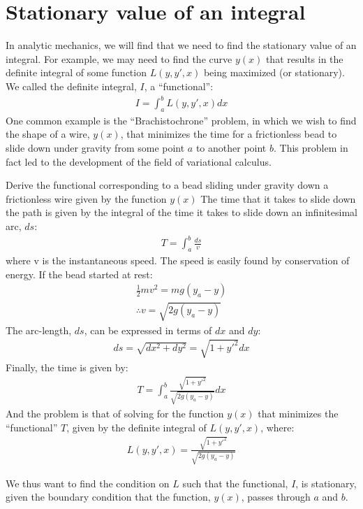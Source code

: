 \section{Stationary value of an integral}
In analytic mechanics, we will find that we need to find the stationary value of an integral. For example, we may need to find the curve $y(x)$ that results in the definite integral of some function $L(y,y',x)$ being maximized (or stationary). We called the definite integral, $I$, a ``functional'':
\begin{align}
I = \int_a^b L(y,y',x)dx
\end{align}
One common example is the ``Brachistochrone'' problem, in which we wish to find the shape of a wire, $y(x)$, that minimizes the time for a frictionless bead to slide down under gravity from some point $a$ to another point $b$. This problem in fact led to the development of the field of variational calculus.
\begin{example}{0pt}{Derive the functional corresponding to a bead sliding under gravity down a frictionless wire given by the function $y(x)$}{}
The time that it takes to slide down the path is given by the integral of the time it takes to slide down an infinitesimal arc, $ds$:
\begin{align*}
T=\int_a^b \frac{ds}{v}
\end{align*}
where v is the instantaneous speed. The speed is easily found by conservation of energy. If the bead started at rest:
\begin{align*}
\frac{1}{2}mv^2=mg(y_a-y)\nonumber\\
\therefore v =\sqrt{2g(y_a-y)}
\end{align*}
The arc-length, $ds$, can be expressed in terms of $dx$ and $dy$:
\begin{align*}
ds=\sqrt{dx^2+dy^2}=\sqrt{1+y'^2}dx
\end{align*}
Finally, the time is given by:
\begin{align*}
T=\int_a^b \frac{\sqrt{1+y'^2}}{\sqrt{2g(y_a-y)}}dx
\end{align*}
And the problem is that of solving for the function $y(x)$ that minimizes the ``functional'' $T$, given by the definite integral of $L(y,y',x)$, where:
\begin{align*}
L(y,y',x)=\frac{\sqrt{1+y'^2}}{\sqrt{2g(y_a-y)}}
\end{align*}
\label{ex:brach}
\end{example}
\noindent
We thus want to find the condition on $L$ such that the functional, $I$, is stationary, given the boundary condition that the function, $y(x)$, passes through $a$ and $b$.

